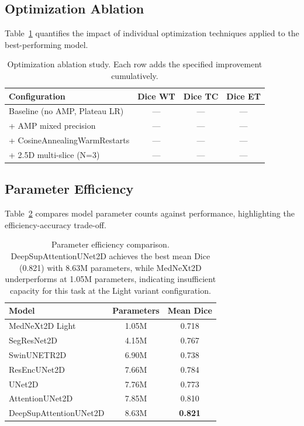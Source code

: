 \documentclass[11pt,a4paper]{article}
\begin{document}
\subsection{Optimization Ablation}
Table~\ref{tab:optimization_ablation} quantifies the impact of individual optimization techniques applied to the best-performing model.

\begin{table}[H]
\centering
\begin{tabular}{lccc}
\toprule
\textbf{Configuration} & \textbf{Dice WT} & \textbf{Dice TC} & \textbf{Dice ET} \\
\midrule
Baseline (no AMP, Plateau LR)  & --- & --- & --- \\
+ AMP mixed precision          & --- & --- & --- \\
+ CosineAnnealingWarmRestarts  & --- & --- & --- \\
+ 2.5D multi-slice (N=3)       & --- & --- & --- \\
\bottomrule
\end{tabular}
\caption{Optimization ablation study. Each row adds the specified improvement cumulatively.}
\label{tab:optimization_ablation}
\end{table}

\subsection{Parameter Efficiency}
Table~\ref{tab:param_efficiency} compares model parameter counts against performance, highlighting the efficiency-accuracy trade-off.

\begin{table}[H]
\centering
\begin{tabular}{lcc}
\toprule
\textbf{Model} & \textbf{Parameters} & \textbf{Mean Dice} \\
\midrule
MedNeXt2D Light      & 1.05M & 0.718 \\
SegResNet2D          & 4.15M & 0.767 \\
SwinUNETR2D          & 6.90M & 0.738 \\
ResEncUNet2D         & 7.66M & 0.784 \\
UNet2D               & 7.76M & 0.773 \\
AttentionUNet2D      & 7.85M & 0.810 \\
DeepSupAttentionUNet2D & 8.63M & \textbf{0.821} \\
\bottomrule
\end{tabular}
\caption{Parameter efficiency comparison. DeepSupAttentionUNet2D achieves the best mean Dice (0.821) with 8.63M parameters, while MedNeXt2D underperforms at 1.05M parameters, indicating insufficient capacity for this task at the Light variant configuration.}
\label{tab:param_efficiency}
\end{table}
\end{document}
